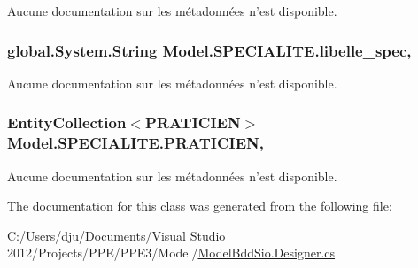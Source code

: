 Aucune documentation sur les métadonnées n'est disponible. 

\hypertarget{class_model_1_1_s_p_e_c_i_a_l_i_t_e_a82916a9c724d347181c4e30fba74c3ff}{
\subsubsection[{libelle\-\_\-spec}]{\setlength{\rightskip}{0pt plus 5cm}global.\-System.\-String Model.\-S\-P\-E\-C\-I\-A\-L\-I\-T\-E.\-libelle\-\_\-spec\hspace{0.3cm}{\ttfamily [get]}, {\ttfamily [set]}}}\label{class_model_1_1_s_p_e_c_i_a_l_i_t_e_a82916a9c724d347181c4e30fba74c3ff}


Aucune documentation sur les métadonnées n'est disponible. 

\hypertarget{class_model_1_1_s_p_e_c_i_a_l_i_t_e_ab96edcc3579c95087e878fdeff929e00}{
\subsubsection[{P\-R\-A\-T\-I\-C\-I\-E\-N}]{\setlength{\rightskip}{0pt plus 5cm}Entity\-Collection$<${\bf P\-R\-A\-T\-I\-C\-I\-E\-N}$>$ Model.\-S\-P\-E\-C\-I\-A\-L\-I\-T\-E.\-P\-R\-A\-T\-I\-C\-I\-E\-N\hspace{0.3cm}{\ttfamily [get]}, {\ttfamily [set]}}}\label{class_model_1_1_s_p_e_c_i_a_l_i_t_e_ab96edcc3579c95087e878fdeff929e00}


Aucune documentation sur les métadonnées n'est disponible. 



The documentation for this class was generated from the following file\-:\begin{DoxyCompactItemize}
\item 
C\-:/\-Users/dju/\-Documents/\-Visual Studio 2012/\-Projects/\-P\-P\-E/\-P\-P\-E3/\-Model/\hyperlink{_model_bdd_sio_8_designer_8cs}{Model\-Bdd\-Sio.\-Designer.\-cs}\end{DoxyCompactItemize}
